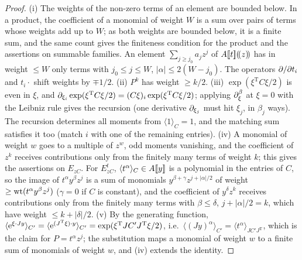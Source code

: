 \begin{proof}
(i) The weights of the non-zero terms of an element are bounded below. In a product, the coefficient of a monomial of weight $W$ is a sum over pairs of terms whose weights add up to $W$; as both weights are bounded below, it is a finite sum, and the same count gives the finiteness condition for the product and the assertions on summable families. An element $\sum_{j\geq j_0}a_jz^j$ of $A[\![ t ]\!](\!(z)\!)$ has in weight $\leq W$ only terms with $j_0\leq j\leq W$, $|\alpha|\leq2(W-j_0)$. The operators $\partial/\partial t_i$ and $t_i\cdot$ shift weights by $\mp1/2$. (ii) $P^k$ has weight $\geq k/2$. (iii) $\exp(\xi^{\mathrm T}C\xi/2)$ is even in $\xi$, and $\partial_{\xi_i}\exp(\xi^{\mathrm T}C\xi/2)=(C\xi)_i\exp(\xi^{\mathrm T}C\xi/2)$; applying $\partial_\xi^\beta$ at $\xi=0$ with the Leibniz rule gives the recursion (one derivative $\partial_{\xi_j}$ must hit $\xi_j$, in $\beta_j$ ways). The recursion determines all moments from $\langle1\rangle_C=1$, and the matching sum satisfies it too (match $i$ with one of the remaining entries). (iv) A monomial of weight $w$ goes to a multiple of $z^w$, odd moments vanishing, and the coefficient of $z^k$ receives contributions only from the finitely many terms of weight $k$; this gives the assertions on $E_{zC}$. For $E^t_{zC}$, $\langle t^\alpha\rangle_C\in A[\![ y ]\!]$ is a polynomial in the entries of $C$, so the image of $t^\alpha y^\beta z^j$ is a sum of monomials $y^{\beta+\gamma}z^{j+|\alpha|/2}$ of weight $\geq\operatorname{wt}(t^\alpha y^\beta z^j)$ ($\gamma=0$ if $C$ is constant), and the coefficient of $y^\delta z^k$ receives contributions only from the finitely many terms with $\beta\leq\delta$, $j+|\alpha|/2=k$, which have weight $\leq k+|\delta|/2$. (v) By the generating function, $\langle\mathrm{e}^{\xi\cdot Jy}\rangle_{C'}=\langle\mathrm{e}^{(J^{\mathrm T}\xi)\cdot y}\rangle_{C'}=\exp(\xi^{\mathrm T}JC'J^{\mathrm T}\xi/2)$, i.e.\ $\langle(Jy)^\alpha\rangle_{C'}=\langle t^\alpha\rangle_{JC'J^{\mathrm T}}$, which is the claim for $P=t^\alpha z^j$; the substitution maps a monomial of weight $w$ to a finite sum of monomials of weight $w$, and (iv) extends the identity.
\end{proof}

